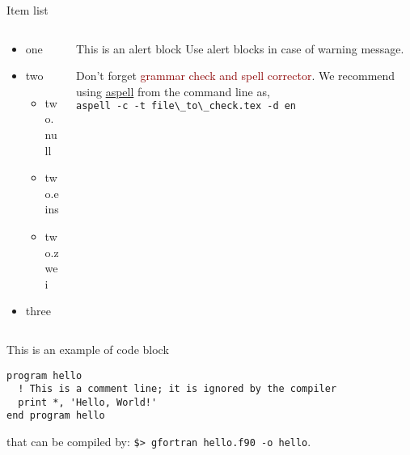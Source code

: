 \documentclass[aspectratio=169,11pt]{beamer}
\newcommand{\cmark}{\ding{51}}%
\newcommand{\xmark}{\ding{55}}
\newcommand{\pro}[1]{\item[{\color{clean_teal}\cmark}] #1}
\newcommand{\con}[1]{\item[{\color{darkred}\xmark}] #1}
\begin{document}
\begin{frame}[fragile]{Item list}
\begin{columns}
\begin{column}{0.35\textwidth}
\begin{itemize}
  \pro one
  \con two
  \begin{itemize}[<alert@+>]
    \item two.null
    \item two.eins
    \item two.zwei
  \end{itemize}
  \item three
\end{itemize}
\end{column}
\begin{column}{0.64\textwidth}
\begin{alertblock}{This is an alert block}
Use alert blocks in case of warning message.
\end{alertblock}
\begin{alertblock}{}\small Don't forget \textcolor{darkred}{grammar check and spell corrector}. We recommend using \href{https://linux.die.net/man/1/aspell}{\textrm{aspell}} from the command line as,\\
\verb|aspell -c -t file\_to\_check.tex -d en|
\end{alertblock}
\end{column}
\end{columns}
%
\begin{exampleblock}{This is an example of code block}\scriptsize
{}
\begin{lstlisting}
program hello
  ! This is a comment line; it is ignored by the compiler
  print *, 'Hello, World!'
end program hello
\end{lstlisting}
that can be compiled by: \lstinline|$> gfortran hello.f90 -o hello|.
\end{exampleblock}
\end{frame}
\end{document}
